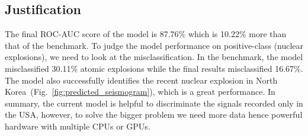 \documentclass[12pt]{article}
\begin{document}
        
        

        
        \subsection{Justification}
        The final ROC-AUC score of the model is 87.76$\%$ which is 10.22$\%$ more than that of the benchmark. To judge the model performance on positive-class (nuclear explosions), we need to look at the misclassification. In the benchmark, the model misclassified 30.11$\%$ atomic explosions while the final results misclassified 16.67$\%$. The model also successfully identifies the recent nuclear explosion in North Korea~(Fig.~\ref{fig:predicted_seismogram}), which is a great performance. In summary, the current model is helpful to discriminate the signals recorded only in the USA, however, to solve the bigger problem we need more data hence powerful hardware with multiple CPUs or GPUs.
    
\end{document}
